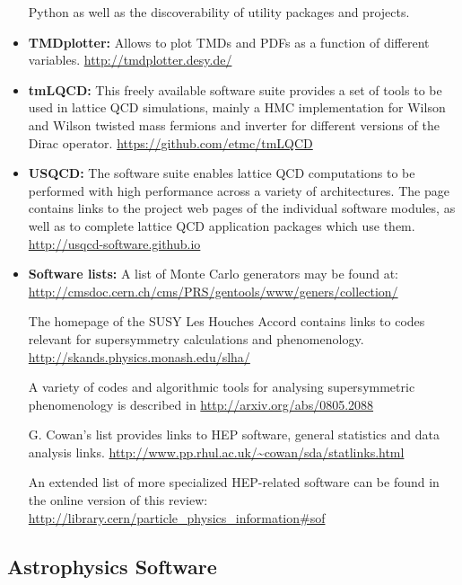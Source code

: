 \begin{itemize}
  Python as well as the discoverability of utility packages and
  projects.
\item
  \textbf{TMDplotter:} Allows to plot TMDs and PDFs as a function of
  different variables. \url{http://tmdplotter.desy.de/}
\item
  \textbf{tmLQCD:} This freely available software suite provides a set
  of tools to be used in lattice QCD simulations, mainly a HMC
  implementation for Wilson and Wilson twisted mass fermions and
  inverter for different versions of the Dirac operator.
  \url{https://github.com/etmc/tmLQCD}
\item
  \textbf{USQCD:} The software suite enables lattice QCD computations to
  be performed with high performance across a variety of architectures.
  The page contains links to the project web pages of the individual
  software modules, as well as to complete lattice QCD application
  packages which use them. \url{http://usqcd-software.github.io}
\item
  \textbf{Software lists:} A list of Monte Carlo generators may be found
  at:
  \url{http://cmsdoc.cern.ch/cms/PRS/gentools/www/geners/collection/}

  The homepage of the SUSY Les Houches Accord contains links to codes
  relevant for supersymmetry calculations and phenomenology.
  \url{http://skands.physics.monash.edu/slha/}

  A variety of codes and algorithmic tools for analysing supersymmetric
  phenomenology is described in \url{http://arxiv.org/abs/0805.2088}

  G. Cowan's list provides links to HEP software, general statistics and
  data analysis links.
  \url{http://www.pp.rhul.ac.uk/~cowan/sda/statlinks.html}

  An extended list of more specialized HEP-related software can be found
  in the online version of this review:
  \url{http://library.cern/particle_physics_information\#sof}
\end{itemize}

\subsection{Astrophysics Software}\label{astrophysics-software}

